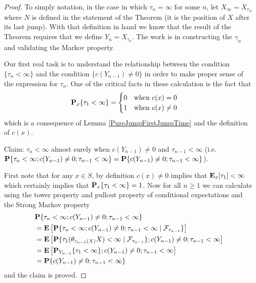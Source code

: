 \begin{proof}
To simply notation, in the case in which $\tau_n = \infty$ for some
$n$, let $X_\infty = X_{\tau_N}$ where $N$ is defined in the statement
of the Theorem (it is the position of $X$ after its last jump). With
that definition in hand we know that the result of the Theorem
requires that we define $Y_n = X_{\tau_n}$.  The work is in
constructing the $\gamma_n$ and validating the Markov property.

Our first real task is to understand the relationship between the condition
$\lbrace \tau_n < \infty \rbrace$ and the condition $\lbrace c(Y_{n-1})
\neq 0 \rbrace$ in order to make proper sense of the expression for
$\tau_n$.  One of the critical facts in these calculation is the fact
that 
\begin{align}\label{AbsorbingDichotomy}
\sprobability{\tau_1 < \infty} {x} &= \begin{cases}
0 & \text{when $c(x) = 0$ } \\
1 & \text{when $c(x) \neq 0$}
\end{cases}
\end{align}
which is a consequence of Lemma \ref{PureJumpFirstJumpTime} and the
definition of $c(x)$.

Claim: $\tau_n < \infty$ almost surely when $c(Y_{n-1}) \neq 0$ and
$\tau_{n-1} < \infty$
(i.e. $\probability{\tau_n < \infty;c(Y_{n-1}) \neq 0; \tau_{n-1} < \infty} =
\probability{c(Y_{n-1}) \neq 0; \tau_{n-1} < \infty}$).

First note that for any $x \in S$, by definition $c(x) \neq 0$ implies
that $\sexpectation{\tau_1}{x} < \infty$ which certainly implies that
$\sprobability{\tau_1 < \infty}{x} =1$.  Now for all $n \geq 1$ we can
calculate using the tower property and pullout property of conditional
expectations and the Strong Markov property
\begin{align*}
&\probability{\tau_n < \infty;c(Y_{n-1}) \neq 0; \tau_{n-1} < \infty} \\
&=\expectation{\cprobability{\mathcal{F}_{\tau_{n-1}}}{\tau_n <
    \infty;c(Y_{n-1}) \neq 0; \tau_{n-1} < \infty}} \\
&=\expectation{\cprobability{\mathcal{F}_{\tau_{n-1}}}{\tau_1(\theta_{\tau_{n-1}(X)}X) <
    \infty};c(Y_{n-1}) \neq 0; \tau_{n-1} < \infty} \\
&=\expectation{\sprobability{\tau_1 <
    \infty}{Y_{n-1}};c(Y_{n-1}) \neq 0; \tau_{n-1} < \infty} \\
&=\probability{c(Y_{n-1}) \neq 0; \tau_{n-1} < \infty} \\
\end{align*}
and the claim is proved.


\end{proof}
